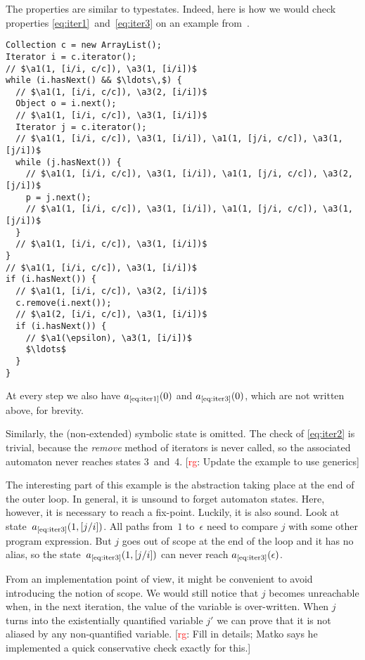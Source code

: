 \documentclass[a4paper]{article}
\newcommand{\todo}[2]{{\small [\textcolor{red}{#1}: #2]}}
\newcommand{\rg}[1]{\todo{rg}{#1}}
\theoremstyle{remark}
\begin{document}
The properties are similar to typestates.
Indeed, here is how we would check properties \eqref{eq:iter1}~and~\eqref{eq:iter3} on an example from~\cite{bierhoff2007}.
{\def\a#1{a_\text{\ref{eq:iter#1}} }
\begin{lstlisting}
Collection c = new ArrayList();
Iterator i = c.iterator();
// $\a1(1, [i/i, c/c]), \a3(1, [i/i])$
while (i.hasNext() && $\ldots\,$) {
  // $\a1(1, [i/i, c/c]), \a3(2, [i/i])$
  Object o = i.next();
  // $\a1(1, [i/i, c/c]), \a3(1, [i/i])$
  Iterator j = c.iterator();
  // $\a1(1, [i/i, c/c]), \a3(1, [i/i]), \a1(1, [j/i, c/c]), \a3(1, [j/i])$
  while (j.hasNext()) {
    // $\a1(1, [i/i, c/c]), \a3(1, [i/i]), \a1(1, [j/i, c/c]), \a3(2, [j/i])$
    p = j.next();
    // $\a1(1, [i/i, c/c]), \a3(1, [i/i]), \a1(1, [j/i, c/c]), \a3(1, [j/i])$
  }
  // $\a1(1, [i/i, c/c]), \a3(1, [i/i])$
}
// $\a1(1, [i/i, c/c]), \a3(1, [i/i])$
if (i.hasNext()) {
  // $\a1(1, [i/i, c/c]), \a3(2, [i/i])$
  c.remove(i.next());
  // $\a1(2, [i/i, c/c]), \a3(1, [i/i])$
  if (i.hasNext()) {
    // $\a1(\epsilon), \a3(1, [i/i])$
    $\ldots$
  }
}
\end{lstlisting}
At every step we also have $\a1(0)$ and $\a3(0)$, which are not written above, for brevity.}
Similarly, the (non-extended) symbolic state is omitted.
The check of \eqref{eq:iter2} is trivial, because the \textit{remove} method of iterators is never called, so the associated automaton never reaches states 3~and~4.
\rg{Update the example to use generics}

The interesting part of this example is the abstraction taking place at the end of the outer loop.
In general, it is unsound to forget automaton states.
Here, however, it is necessary to reach a fix-point.
Luckily, it is also sound.
Look at state~$a_\text{\ref{eq:iter3}}(1, [j/i])$.
All paths from~$1$ to~$\epsilon$ need to compare $j$ with some other program expression.
But $j$ goes out of scope at the end of the loop and it has no alias, so the state~$a_\text{\ref{eq:iter3}}(1, [j/i])$ can never reach $a_\text{\ref{eq:iter3}}(\epsilon)$.

From an implementation point of view, it might be convenient to avoid introducing the notion of scope.
We would still notice that $j$ becomes unreachable when, in the next iteration, the value of the variable is over-written.
When $j$ turns into the existentially quantified variable $j'$ we can prove that it is not aliased by any non-quantified variable.
\rg{Fill in details; Matko says he implemented a quick conservative check exactly for this.}
\end{document}
